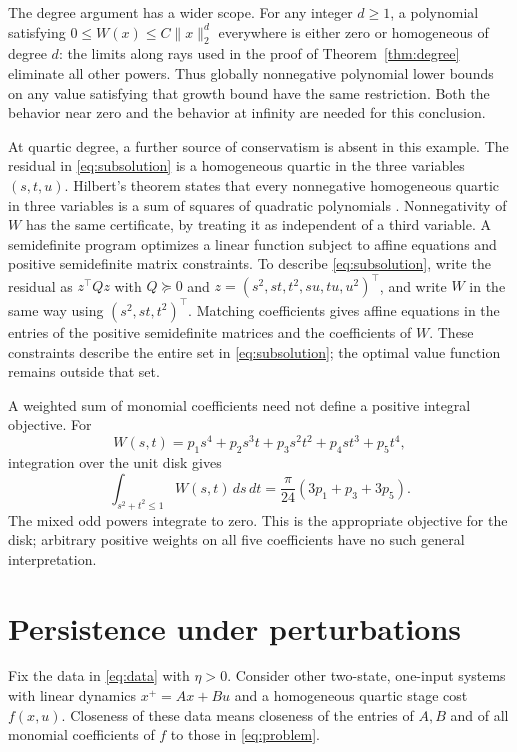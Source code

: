 \documentclass[10pt]{article}
\begin{document}
The degree argument has a wider scope. For any integer $d\geq1$, a polynomial satisfying $0\leq W(x)\leq C\|x\|_2^d$ everywhere is either zero or homogeneous of degree $d$: the limits along rays used in the proof of Theorem~\ref{thm:degree} eliminate all other powers. Thus globally nonnegative polynomial lower bounds on any value satisfying that growth bound have the same restriction. Both the behavior near zero and the behavior at infinity are needed for this conclusion.

At quartic degree, a further source of conservatism is absent in this example. The residual in \eqref{eq:subsolution} is a homogeneous quartic in the three variables $(s,t,u)$. Hilbert's theorem states that every nonnegative homogeneous quartic in three variables is a sum of squares of quadratic polynomials \cite{powers}. Nonnegativity of $W$ has the same certificate, by treating it as independent of a third variable. A semidefinite program optimizes a linear function subject to affine equations and positive semidefinite matrix constraints. To describe \eqref{eq:subsolution}, write the residual as $z^\top Qz$ with $Q\succeq0$ and $z=(s^2,st,t^2,su,tu,u^2)^\top$, and write $W$ in the same way using $(s^2,st,t^2)^\top$. Matching coefficients gives affine equations in the entries of the positive semidefinite matrices and the coefficients of $W$. These constraints describe the entire set in \eqref{eq:subsolution}; the optimal value function remains outside that set.

A weighted sum of monomial coefficients need not define a positive integral objective. For
\[
 W(s,t)=p_1s^4+p_2s^3t+p_3s^2t^2+p_4st^3+p_5t^4,
\]
integration over the unit disk gives
\begin{equation}
 \int_{s^2+t^2\leq1}W(s,t)\,ds\,dt
 =\frac{\pi}{24}(3p_1+p_3+3p_5).
 \label{eq:moment-objective}
\end{equation}
The mixed odd powers integrate to zero. This is the appropriate objective for the disk; arbitrary positive weights on all five coefficients have no such general interpretation.

\section{Persistence under perturbations}

Fix the data in \eqref{eq:data} with $\eta>0$. Consider other two-state, one-input systems with linear dynamics $x^+=Ax+Bu$ and a homogeneous quartic stage cost $f(x,u)$. Closeness of these data means closeness of the entries of $A,B$ and of all monomial coefficients of $f$ to those in \eqref{eq:problem}.
\end{document}

